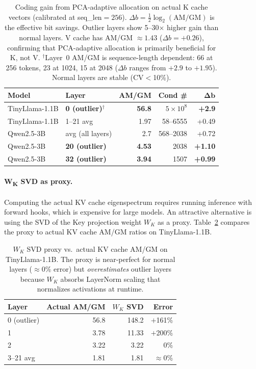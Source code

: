 \begin{table}[h]
\centering
\begin{tabular}{llrrr}
\toprule
\textbf{Model} & \textbf{Layer} & \textbf{AM/GM} & \textbf{Cond \#} & $\boldsymbol{\Delta b}$ \\
\midrule
TinyLlama-1.1B & \textbf{0 (outlier)}$^\dagger$ & \textbf{56.8} & $5 \times 10^8$ & \textbf{+2.9} \\
TinyLlama-1.1B & 1--21 avg & 1.97 & 58--6555 & +0.49 \\
\midrule
Qwen2.5-3B & avg (all layers) & 2.7 & 568--2038 & +0.72 \\
Qwen2.5-3B & \textbf{20 (outlier)} & \textbf{4.53} & 2038 & \textbf{+1.10} \\
Qwen2.5-3B & \textbf{32 (outlier)} & \textbf{3.94} & 1507 & \textbf{+0.99} \\
\bottomrule
\end{tabular}
\caption{Coding gain from PCA-adaptive allocation on actual K cache vectors (calibrated at seq\_len${}=256$). $\Delta b = \frac{1}{2}\log_2(\text{AM/GM})$ is the effective bit savings. Outlier layers show 5--30$\times$ higher gain than normal layers. V cache has AM/GM $\approx 1.43$ ($\Delta b = +0.26$), confirming that PCA-adaptive allocation is primarily beneficial for K, not V. $^\dagger$Layer~0 AM/GM is sequence-length dependent: 66 at 256 tokens, 23 at 1024, 15 at 2048 ($\Delta b$ ranges from $+2.9$ to $+1.95$). Normal layers are stable (CV$<$10\%).}
\label{tab:amgm}
\end{table}

\paragraph{W\textsubscript{K} SVD as proxy.}
Computing the actual KV cache eigenspectrum requires running inference with forward hooks, which is expensive for large models. An attractive alternative is using the SVD of the Key projection weight $W_K$ as a proxy. Table~\ref{tab:proxy} compares the proxy to actual KV cache AM/GM ratios on TinyLlama-1.1B.

\begin{table}[h]
\centering
\begin{tabular}{lrrr}
\toprule
\textbf{Layer} & \textbf{Actual AM/GM} & \textbf{$W_K$ SVD} & \textbf{Error} \\
\midrule
0 (outlier) & 56.8 & 148.2 & $+$161\% \\
1 & 3.78 & 11.33 & $+$200\% \\
2 & 3.22 & 3.22 & 0\% \\
3--21 avg & 1.81 & 1.81 & $\approx$0\% \\
\bottomrule
\end{tabular}
\caption{$W_K$ SVD proxy vs.\ actual KV cache AM/GM on TinyLlama-1.1B. The proxy is near-perfect for normal layers ($\approx$0\% error) but \emph{overestimates} outlier layers because $W_K$ absorbs LayerNorm scaling that normalizes activations at runtime.}
\label{tab:proxy}
\end{table}

